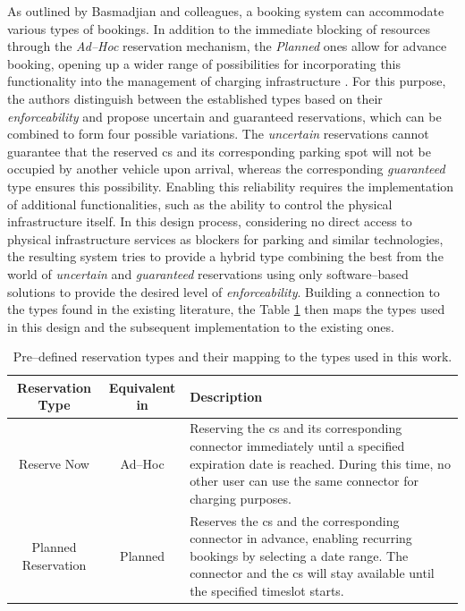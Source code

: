 As outlined by Basmadjian and colleagues, a booking system can accommodate various types of bookings. In addition to the immediate blocking of resources through the \textit{Ad--Hoc} reservation mechanism, the \textit{Planned} ones allow for advance booking, opening up a wider range of possibilities for incorporating this functionality into the management of charging infrastructure \cite{basmadjian_reference_2020,basmadjian_interoperable_2019}.
For this purpose, the authors distinguish between the established types based on their \textit{enforceability} and propose uncertain and guaranteed reservations, which can be combined to form four possible variations.
The \textit{uncertain} reservations cannot guarantee that the reserved \acrshort{cs} and its corresponding parking spot will not be occupied by another vehicle upon arrival, whereas the corresponding \textit{guaranteed} type ensures this possibility.
Enabling this reliability requires the implementation of additional functionalities, such as the ability to control the physical infrastructure itself.
In this design process, considering no direct access to physical infrastructure services as blockers for parking and similar technologies, the resulting system tries to provide a hybrid type combining the best from the world of \textit{uncertain} and \textit{guaranteed} reservations using only software--based solutions to provide the desired level of \textit{enforceability}.
Building a connection to the types found in the existing literature, the Table \ref{tab:reservation-types} then maps the types used in this design and the subsequent implementation to the existing ones.

\begingroup
\setlength{\tabcolsep}{10pt} %
\renewcommand{\arraystretch}{1.5} %
\begin{table}[h]
    \centering
    \caption{Pre--defined reservation types and their mapping to the types used in this work.}
    \begin{tabular}{c|c|m{6.5cm}}
        Reservation Type & Equivalent in \cite{basmadjian_reference_2020,basmadjian_interoperable_2019} & Description \\ \hline
        Reserve Now & Ad--Hoc & Reserving the \acrshort{cs} and its corresponding connector immediately until a specified expiration date is reached. During this time, no other user can use the same connector for charging purposes. \\
        Planned Reservation & Planned & Reserves the \acrshort{cs} and the corresponding connector in advance, enabling recurring bookings by selecting a date range. The connector and the \acrshort{cs} will stay available until the specified timeslot starts.
    \end{tabular}
    \label{tab:reservation-types}
\end{table}
\endgroup


